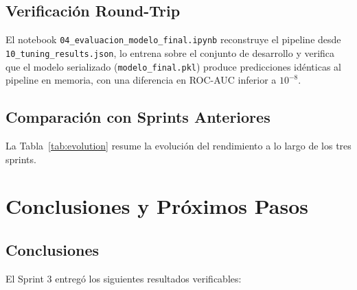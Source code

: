 \documentclass[journal,letterpaper]{IEEEtran}
\begin{document}
\subsection{Verificación Round-Trip}
El notebook \texttt{04\_evaluacion\_modelo\_final.ipynb} reconstruye el pipeline desde \texttt{10\_tuning\_results.json}, lo entrena sobre el conjunto de desarrollo y verifica que el modelo serializado (\texttt{modelo\_final.pkl}) produce predicciones idénticas al pipeline en memoria, con una diferencia en ROC-AUC inferior a $10^{-8}$.

\subsection{Comparación con Sprints Anteriores}
La Tabla~\ref{tab:evolution} resume la evolución del rendimiento a lo largo de los tres sprints.

\begin{table}[h]
\centering
\caption{Evolución de Métricas por Sprint}
\label{tab:evolution}
\end{table}

\section{Conclusiones y Próximos Pasos}

\subsection{Conclusiones}
El Sprint 3 entregó los siguientes resultados verificables:
\end{document}
